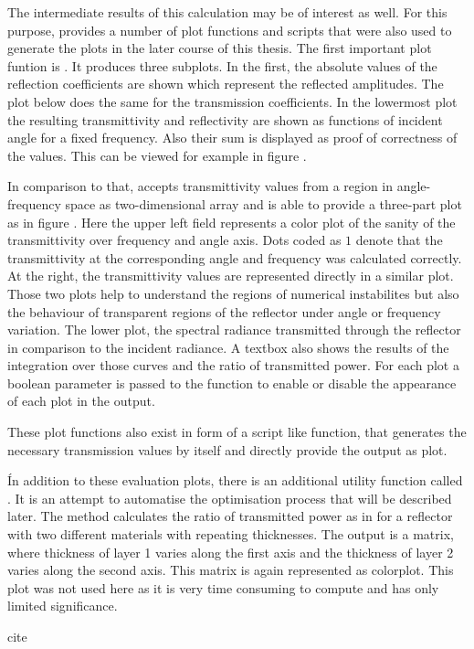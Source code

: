 The intermediate results of this calculation may be of interest as well. For
this purpose,  provides a number of plot functions and
scripts that were also used to generate the plots in the later course of this
thesis. The first important plot funtion is .
It produces three subplots. In the first, the absolute values of the reflection
coefficients are shown which represent the reflected amplitudes. The plot below
does the same for the transmission coefficients. In the lowermost plot the
resulting transmittivity and reflectivity are shown as functions of
incident angle for a fixed frequency. Also their sum is displayed as proof of 
correctness of the values. This can be viewed for example in figure
.

In comparison to that,  accepts transmittivity values from
a region in angle-frequency space as two-dimensional array and is able to
provide a three-part plot as in figure . Here the
upper left field represents a color plot of the sanity of the transmittivity
over frequency and angle axis. Dots coded as $1$ denote that the transmittivity
at the corresponding angle and frequency was calculated correctly. At the
right, the transmittivity values are represented directly in a similar plot.
Those two plots help to understand the regions of numerical instabilites but
also the behaviour of transparent regions of the reflector under angle or
frequency variation. The lower plot, the spectral radiance transmitted through
the reflector in comparison to the incident radiance. A textbox also shows the
results of the integration over those curves and the ratio of transmitted
power.
For each plot a boolean parameter is passed to the function to enable or
disable the appearance of each plot in the output.

These plot functions also exist in form of a script like function, that
generates the necessary transmission values by itself and directly provide the
output as plot.

Ín addition to these evaluation plots, there is an additional utility function
called
. It is an attempt to automatise the
optimisation process that will be described later. The method calculates the
ratio of transmitted power as in  for a reflector with
two different materials with repeating thicknesses. The output is a matrix,
where thickness of layer 1 varies along the first axis and the thickness of
layer 2 varies along the second axis. This matrix is again represented as
colorplot. This plot was not used here as it is very time consuming to compute
and has only limited significance.

cite